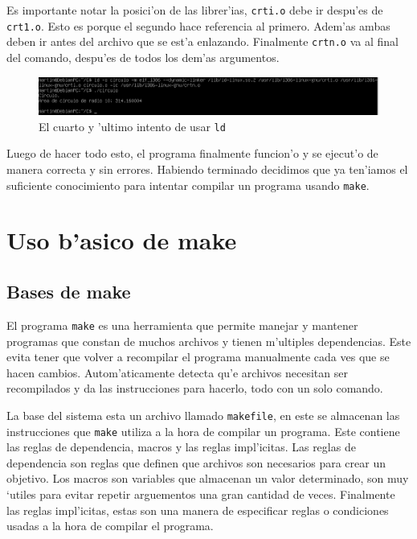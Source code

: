 \documentclass[11pt]{article}
\begin{document}
		Es importante notar la posici'on de las librer'ias, \texttt{crti.o} debe ir despu'es de \texttt{crt1.o}. Esto es porque el segundo hace referencia al primero. Adem'as ambas deben ir antes del archivo que se est'a enlazando. Finalmente \texttt{crtn.o} va al final del comando, despu'es de todos los dem'as argumentos.
		
		\begin{figure}[H]
			\centering
			\includegraphics[width=.9\linewidth]{Images/Seccion 1/S1 parte nueve.PNG}
			\caption{El cuarto y 'ultimo intento de usar \texttt{ld}}
			\label{fig:fourth-ld-attempt}
		\end{figure}
		
		Luego de hacer todo esto, el programa finalmente funcion'o y se ejecut'o de manera correcta y sin errores. Habiendo terminado decidimos que ya ten'iamos el suficiente conocimiento para intentar compilar un programa usando \texttt{make}.
		
		
	\section{Uso b'asico de make}
	\subsection{Bases de make}
		El programa \texttt{make} es una herramienta que permite manejar y mantener programas que constan de muchos archivos y tienen m'ultiples dependencias. Este evita tener que volver a recompilar el programa manualmente cada ves que se hacen cambios. Autom'aticamente detecta qu'e archivos necesitan ser recompilados y da las instrucciones para hacerlo, todo con un solo comando.
		
		La base del sistema esta un archivo llamado \texttt{makefile}, en este se almacenan las instrucciones que \texttt{make} utiliza a la hora de compilar un programa. Este contiene las reglas de dependencia, macros y las reglas impl'icitas. Las reglas de dependencia son reglas que definen que archivos son necesarios para crear un objetivo\footnotemark. Los macros son variables que almacenan un valor determinado, son muy `utiles para evitar repetir arguementos una gran cantidad de veces. Finalmente las reglas impl'icitas, estas son una manera de especificar reglas o condiciones usadas a la hora de compilar el programa.
		
\end{document}

